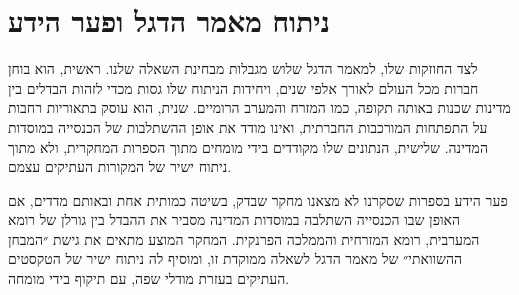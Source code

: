 \section{ניתוח מאמר הדגל ופער הידע}
\label{sec:lit-gap}

לצד החוזקות שלו, למאמר הדגל שלוש מגבלות מבחינת השאלה שלנו. ראשית, הוא בוחן חברות מכל העולם לאורך אלפי שנים, ויחידות הניתוח שלו גסות מכדי לזהות הבדלים בין מדינות שכנות באותה תקופה, כמו המזרח והמערב הרומיים. שנית, הוא עוסק בתאוריות רחבות על התפתחות המורכבות החברתית, ואינו מודד את אופן ההשתלבות של הכנסייה במוסדות המדינה. שלישית, הנתונים שלו מקודדים בידי מומחים מתוך הספרות המחקרית, ולא מתוך ניתוח ישיר של המקורות העתיקים עצמם.

\begin{keybox}{פער הידע}
בספרות שסקרנו לא מצאנו מחקר שבדק, בשיטה כמותית אחת ובאותם מדדים, אם האופן שבו הכנסייה השתלבה במוסדות המדינה מסביר את ההבדל בין גורלן של רומא המערבית, רומא המזרחית והממלכה הפרנקית. המחקר המוצע מתאים את גישת ״המבחן ההשוואתי״ של מאמר הדגל לשאלה ממוקדת זו, ומוסיף לה ניתוח ישיר של הטקסטים העתיקים בעזרת מודלי שפה, עם תיקוף בידי מומחה.
\end{keybox}
